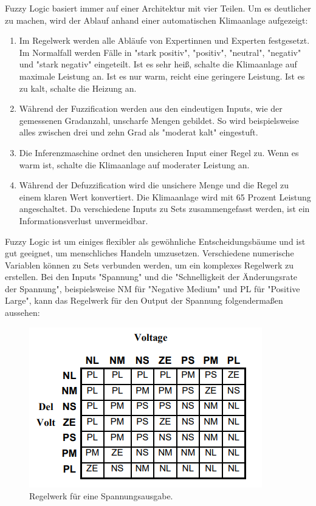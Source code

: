 Fuzzy Logic basiert immer auf einer Architektur mit vier Teilen.\cite{fuzzy-logic-introduction} Um es deutlicher zu machen, wird der Ablauf anhand einer automatischen Klimaanlage aufgezeigt:
\begin{enumerate}
    \item Im Regelwerk werden alle Abläufe von Expertinnen und Experten festgesetzt. Im Normalfall werden Fälle in "stark positiv", "positiv", "neutral", "negativ" und "stark negativ" eingeteilt. Ist es sehr heiß, schalte die Klimaanlage auf maximale Leistung an. Ist es nur warm, reicht eine geringere Leistung. Ist es zu kalt, schalte die Heizung an.
    \item Während der Fuzzification werden aus den eindeutigen Inputs, wie der gemessenen Gradanzahl, unscharfe Mengen gebildet. So wird beispielsweise alles zwischen drei und zehn Grad als "moderat kalt" eingestuft.
    \item Die Inferenzmaschine ordnet den unsicheren Input einer Regel zu. Wenn es warm ist, schalte die Klimaanlage auf moderater Leistung an.
    \item Während der Defuzzification wird die unsichere Menge und die Regel zu einem klaren Wert konvertiert. Die Klimaanlage wird mit 65 Prozent Leistung angeschaltet. Da verschiedene Inputs zu Sets zusammengefasst werden, ist ein Informationsverlust unvermeidbar.
\end{enumerate}

Fuzzy Logic ist um einiges flexibler als gewöhnliche Entscheidungsbäume und ist gut geeignet, um menschliches Handeln umzusetzen. Verschiedene numerische Variablen können zu Sets verbunden werden, um ein komplexes Regelwerk zu erstellen. Bei den Inputs "Spannung" und die "Schnelligkeit der Änderungsrate der Spannung", beispielsweise NM für "Negative Medium" und PL für "Positive Large", kann das Regelwerk für den Output der Spannung folgendermaßen aussehen:

\begin{figure}[H]
\centering
\includegraphics[width=\textwidth]{images/fuzzyVolt.png}
\caption{Regelwerk für eine Spannungsausgabe. \cite{lameres1998fuzzy}}
\label{fig:Fuzzy Voltage Controller}
\end{figure}

